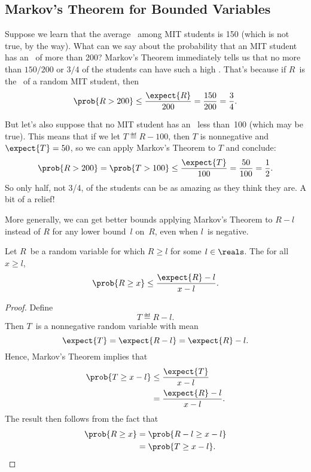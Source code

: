 \subsection{Markov's Theorem for Bounded Variables}

Suppose we learn that the average \IQ\ among MIT students is 150
(which is not true, by the way).  What can we say about the
probability that an MIT student has an \IQ\ of more than 200?
Markov's Theorem immediately tells us that no more than $150/200$ or
$3/4$ of the students can have such a high \IQ.  That's because if
$R$~is the \IQ\ of a random MIT student, then
\[
    \prob{R > 200} \leq \frac{\expect{R}}{200}= \frac{150}{200} = \frac{3}{4}.
\]

But let's also suppose that no MIT student has an \IQ\ less than~100
(which may be true).  This means that if we let $T \eqdef R-100$, then
$T$ is nonnegative and $\expect{T} = 50$, so we can apply Markov's
Theorem to $T$ and conclude:
\[
\prob{R > 200} = \prob{T > 100} \leq \frac{\expect{T}}{100}= \frac{50}{100} =
\frac{1}{2}.
\]
So only half, not 3/4, of the students can be as amazing as they think
they are.  A bit of a relief!

More generally, we can get better bounds applying Markov's Theorem to
$R-l$ instead of $R$ for any lower bound~$l$ on~$R$, even when $l$~is
negative.

\begin{theorem}\label{thm:18C1}
Let $R$~be a random variable for which $R \ge l$ for some $l \in
\reals$.  The for all~$x \ge l$,
\begin{equation*}
    \prob{R \ge x} \le \frac{\expect{R} - l}{x - l}.
\end{equation*}
\end{theorem}

\begin{proof}
Define
\begin{equation*}
    T \eqdef R - l.
\end{equation*}
Then $T$~is a nonnegative random variable with mean
\begin{equation*}
\expect{T} = \expect{R - l} = \expect{R} - l.
\end{equation*}
Hence, Markov's Theorem implies that
\begin{align*}
\prob{T \ge x - l}
    &\le \frac{\expect{T}}{x - l} \\
    &=   \frac{\expect{R} - l}{x - l}.
\end{align*}
The result then follows from the fact that
\begin{align*}
\prob{R \ge x}
    &= \prob{R - l \ge x - l} \\
    &= \prob{T \ge x - l}. \qedhere
\end{align*}
\end{proof}

